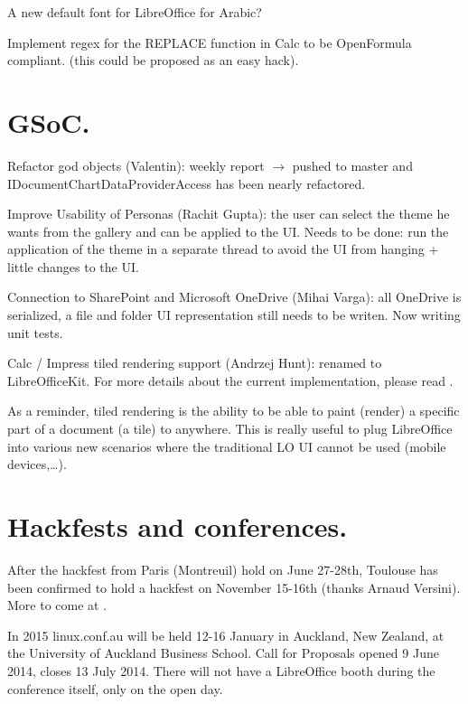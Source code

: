 \documentclass{article}
\begin{document}
A new default font for LibreOffice for Arabic?\cite{arabicFont}

Implement regex for the REPLACE function in Calc to be OpenFormula
compliant. (this could be proposed as an easy hack)\cite{replaceRegexOpenFormula}.

\section{GSoC.}

Refactor god objects (Valentin): weekly report $\rightarrow$ pushed to master and
IDocumentChartDataProviderAccess has been nearly refactored.

Improve Usability of Personas (Rachit Gupta): the user can select the theme he wants from the gallery and can
be applied to the UI.
Needs to be done: run the application of the theme in a separate thread
to avoid the UI from hanging + little changes to the UI.

Connection to SharePoint and Microsoft OneDrive (Mihai Varga): all OneDrive is serialized, a file and folder UI
representation still needs to be writen. Now writing unit tests.

Calc / Impress tiled rendering support (Andrzej Hunt): renamed to LibreOfficeKit. For more details about the current implementation, please read \cite{tiledRenderingArticle}.

As a reminder, tiled rendering is the ability to be able to paint (render) a specific part of a document (a tile) to anywhere. This is really useful to plug LibreOffice into various new scenarios where the traditional LO UI cannot be used (mobile devices,\ldots).

\section{Hackfests and conferences.}

After the hackfest from Paris (Montreuil) hold on June 27-28th, Toulouse
has been confirmed to hold a hackfest on November 15-16th\cite{hackfestToulouse} (thanks Arnaud Versini). More to come at \cite{hackfestToulouseWiki}.

In 2015 linux.conf.au will be held 12-16 January in Auckland, New
Zealand, at the University of Auckland Business School.
Call for Proposals opened 9 June 2014, closes 13 July 2014\cite{linuxConfAuckland1}. There will not have a LibreOffice booth during the conference itself, only on the open day\cite{linuxConfAuckland2}.
\end{document}
